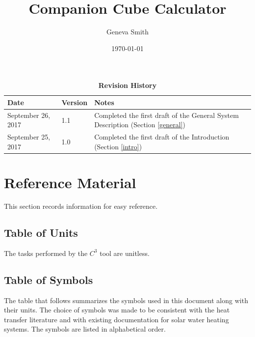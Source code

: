\documentclass[12pt]{article}
\newcommand{\prognameAbbrv}{$C^{3}$}
\begin{document}
\title{Companion Cube Calculator} 
\author{Geneva Smith}
\date{\today}
	
\maketitle

\tableofcontents

\begin{table}[bp]
\caption{\bf Revision History}
\begin{tabularx}{\textwidth}{p{3cm}p{2cm}X}
\toprule {\bf Date} & {\bf Version} & {\bf Notes}\\
\midrule
September 26, 2017 & 1.1 & Completed the first draft of the General System 
Description (Section \ref{general})\\
September 25, 2017 & 1.0 & Completed the first draft of the Introduction 
(Section \ref{intro})\\
\bottomrule
\end{tabularx}
\end{table}

\newpage
\section{Reference Material}

This section records information for easy reference.

\subsection{Table of Units}

The tasks performed by the \prognameAbbrv{} tool are unitless.

\subsection{Table of Symbols}

The table that follows summarizes the symbols used in this document along with
their units.  The choice of symbols was made to be consistent with the heat
transfer literature and with existing documentation for solar water heating
systems.  The symbols are listed in alphabetical order.
\end{document}
